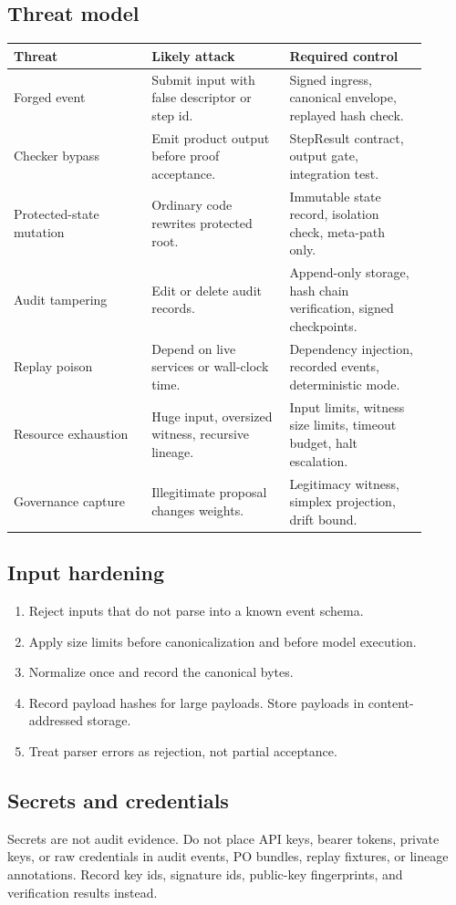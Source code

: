 \documentclass[11pt,oneside]{article}
\begin{document}
\subsection{Threat model}
\begin{longtable}{@{}p{0.30\linewidth}p{0.30\linewidth}p{0.30\linewidth}@{}}
\toprule
\textbf{Threat} & \textbf{Likely attack} & \textbf{Required control} \\
\midrule
Forged event & Submit input with false descriptor or step id. & Signed ingress, canonical envelope, replayed hash check. \\
Checker bypass & Emit product output before proof acceptance. & StepResult contract, output gate, integration test. \\
Protected-state mutation & Ordinary code rewrites protected root. & Immutable state record, isolation check, meta-path only. \\
Audit tampering & Edit or delete audit records. & Append-only storage, hash chain verification, signed checkpoints. \\
Replay poison & Depend on live services or wall-clock time. & Dependency injection, recorded events, deterministic mode. \\
Resource exhaustion & Huge input, oversized witness, recursive lineage. & Input limits, witness size limits, timeout budget, halt escalation. \\
Governance capture & Illegitimate proposal changes weights. & Legitimacy witness, simplex projection, drift bound. \\
\bottomrule
\end{longtable}

\subsection{Input hardening}
\begin{enumerate}
\item Reject inputs that do not parse into a known event schema.
\item Apply size limits before canonicalization and before model execution.
\item Normalize once and record the canonical bytes.
\item Record payload hashes for large payloads. Store payloads in content-addressed storage.
\item Treat parser errors as rejection, not partial acceptance.
\end{enumerate}

\subsection{Secrets and credentials}
Secrets are not audit evidence. Do not place API keys, bearer tokens, private keys, or raw credentials in audit events, PO bundles, replay fixtures, or lineage annotations. Record key ids, signature ids, public-key fingerprints, and verification results instead.
\end{document}
